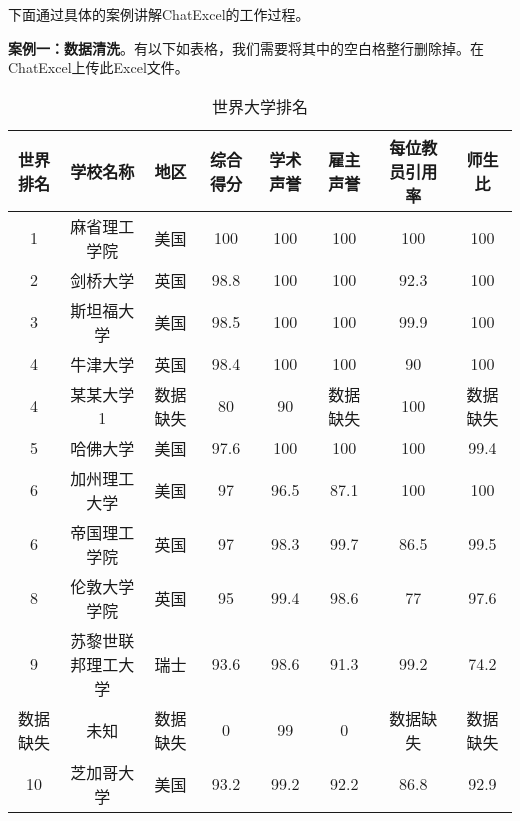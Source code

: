 下面通过具体的案例讲解ChatExcel的工作过程。

\textbf{案例一：数据清洗}。有以下如表格，我们需要将其中的空白格整行删除掉。在ChatExcel上传此Excel文件。
\begin{table}[h]
    \centering
    \footnotesize
    \begin{tabular}{cccccccc}
        \toprule
        世界排名 & 学校名称 & 地区 & 综合得分 & 学术声誉 & 雇主声誉 & 每位教员引用率 & 师生比 \\
        \midrule
        1  & 麻省理工学院     & 美国 & 100  & 100  & 100  & 100  & 100  \\
        2  & 剑桥大学         & 英国 & 98.8 & 100  & 100  & 92.3 & 100  \\
        3  & 斯坦福大学       & 美国 & 98.5 & 100  & 100  & 99.9 & 100  \\
        4  & 牛津大学         & 英国 & 98.4 & 100  & 100  & 90   & 100  \\
        4  & 某某大学1        & 数据缺失 & 80   & 90   & 数据缺失 & 100  & 数据缺失 \\
        5  & 哈佛大学         & 美国 & 97.6 & 100  & 100  & 100  & 99.4 \\
        6  & 加州理工大学     & 美国 & 97   & 96.5 & 87.1 & 100  & 100  \\
        6  & 帝国理工学院     & 英国 & 97   & 98.3 & 99.7 & 86.5 & 99.5 \\
        8  & 伦敦大学学院     & 英国 & 95   & 99.4 & 98.6 & 77   & 97.6 \\
        9  & 苏黎世联邦理工大学 & 瑞士 & 93.6 & 98.6 & 91.3 & 99.2 & 74.2 \\
        数据缺失  & 未知             & 数据缺失 & 0    & 99   & 0    & 数据缺失 & 数据缺失 \\
        10 & 芝加哥大学       & 美国 & 93.2 & 99.2 & 92.2 & 86.8 & 92.9 \\
        \bottomrule
    \end{tabular}
    \caption{世界大学排名}
    \label{tab:world_ranking1}
\end{table}
\FloatBarrier






